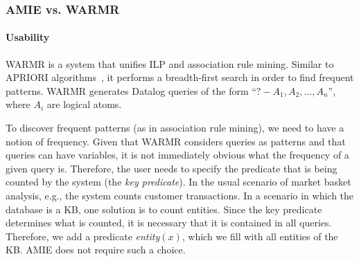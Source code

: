 \subsubsection{AMIE vs. WARMR}

\paragraph{Usability} WARMR is a system that unifies ILP and association rule mining. Similar to APRIORI algorithms~\cite{Agrawal:1996:FDA:257938.257975}, it performs a 
breadth-first search in order to find frequent patterns.
WARMR generates Datalog queries of the form ``$?-A_1,A_2,...,A_n$'',
where $A_i$ are logical atoms.

To discover frequent patterns (as in association rule mining), we need to have a notion of frequency. Given that WARMR considers queries as patterns and that queries can have variables, it is not immediately obvious what the frequency of a given query is. Therefore, the user needs to specify 
the predicate that is being counted by the system (the \textit{key predicate}). In the usual scenario of market basket analysis, e.g., the system counts customer transactions. In a scenario in which the database is a KB, one solution is to count entities. Since the key predicate determines what is counted, it is necessary that it is contained in all queries. Therefore, we add a predicate \emph{entity}$(x)$, which we fill with all entities of the KB. AMIE does not require such a choice. 



